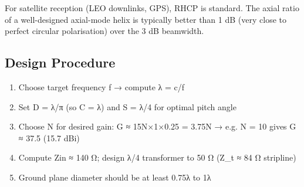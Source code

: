For satellite reception (LEO downlinks, GPS), RHCP is standard. The axial ratio of a well-designed axial-mode helix is typically better than 1 dB (very close to perfect circular polarisation) over the 3 dB beamwidth.

				

\subsection{Design Procedure}

				
\begin{enumerate}

					\item Choose target frequency f → compute λ = c/f

					\item Set D = λ/π (so C = λ) and S = λ/4 for optimal pitch angle

					\item Choose N for desired gain: G ≈ 15N×1×0.25 = 3.75N → e.g. N = 10 gives G ≈ 37.5 (15.7 dBi)

					\item Compute Zin ≈ 140 Ω; design λ/4 transformer to 50 Ω (Z\_t ≈ 84 Ω stripline)

					\item Ground plane diameter should be at least 0.75λ to 1λ

				
\end{enumerate}



